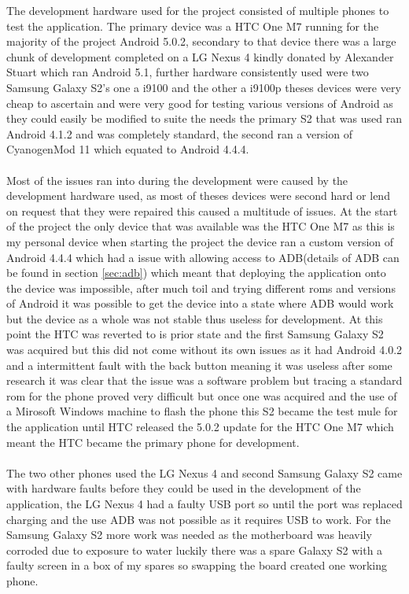 The development hardware used for the project consisted of multiple phones to test the application. The primary device was a HTC One M7 running for the majority of the project Android 5.0.2, secondary to that device there was a large chunk of development completed on a LG Nexus 4 kindly donated by Alexander Stuart which ran Android 5.1, further hardware consistently used were two Samsung Galaxy S2's one a i9100 and the other a i9100p theses devices were very cheap to ascertain and were very good for testing various versions of Android as they could easily be modified to suite the needs the primary S2 that was used ran Android 4.1.2 and was completely standard, the second ran a version of CyanogenMod 11 which equated to Android 4.4.4.\\
\\
Most of the issues ran into during the development were caused by the development hardware used, as most of theses devices were second hard or lend on request that they were repaired this caused a multitude of issues. At the start of the project the only device that was available was the HTC One M7 as this is my personal device when starting the project the device ran a custom version of Android 4.4.4 which had a issue with allowing access to ADB(details of ADB can be found in section \ref{sec:adb}) which meant that deploying the application onto the device was impossible, after much toil and trying different roms and versions of Android it was possible to get the device into a state where ADB would work but the device as a whole was not stable thus useless for development. At this point the HTC was reverted to is prior state and the first Samsung Galaxy S2 was acquired but this did not come without its own issues as it had Android 4.0.2 and a intermittent fault with the back button meaning it was useless after some research it was clear that the issue was a software problem but tracing a standard rom for the phone proved very difficult but once one was acquired and the use of a Mirosoft Windows machine to flash the phone this S2 became the test mule for the application until HTC released the 5.0.2 update for the HTC One M7 which meant the HTC became the primary phone for development.\\
\\
The two other phones used the LG Nexus 4 and second Samsung Galaxy S2 came with hardware faults before they could be used in the development of the application, the LG Nexus 4 had a faulty USB port so until the port was replaced charging and the use ADB was not possible as it requires USB to work. For the Samsung Galaxy S2 more work was needed as the motherboard was heavily corroded due to exposure to water luckily there was a spare Galaxy S2 with a faulty screen in a box of my spares so swapping the board created one working phone.\\
